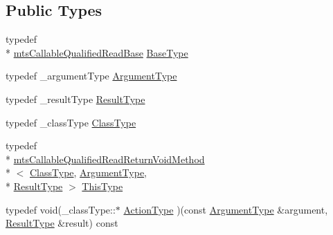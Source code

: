 \subsection*{Public Types}
\begin{DoxyCompactItemize}
\item 
typedef \\*
\hyperlink{classmts_callable_qualified_read_base}{mts\-Callable\-Qualified\-Read\-Base} \hyperlink{classmts_callable_qualified_read_return_void_method_ac485c35956ba406a7863f66264b290d4}{Base\-Type}
\item 
typedef \-\_\-argument\-Type \hyperlink{classmts_callable_qualified_read_return_void_method_a6edb7e6ad0ead0f74cfe2751d45532c5}{Argument\-Type}
\item 
typedef \-\_\-result\-Type \hyperlink{classmts_callable_qualified_read_return_void_method_a533ffd51ea529b0a585985eaf06ab08f}{Result\-Type}
\item 
typedef \-\_\-class\-Type \hyperlink{classmts_callable_qualified_read_return_void_method_ae99cfab8208eb374f2cdf01c97edfa3b}{Class\-Type}
\item 
typedef \\*
\hyperlink{classmts_callable_qualified_read_return_void_method}{mts\-Callable\-Qualified\-Read\-Return\-Void\-Method}\\*
$<$ \hyperlink{classmts_callable_qualified_read_return_void_method_ae99cfab8208eb374f2cdf01c97edfa3b}{Class\-Type}, \hyperlink{classmts_callable_qualified_read_return_void_method_a6edb7e6ad0ead0f74cfe2751d45532c5}{Argument\-Type}, \\*
\hyperlink{classmts_callable_qualified_read_return_void_method_a533ffd51ea529b0a585985eaf06ab08f}{Result\-Type} $>$ \hyperlink{classmts_callable_qualified_read_return_void_method_a916abe9c683c314f85c9b67c960a67f9}{This\-Type}
\item 
typedef void(\-\_\-class\-Type\-::$\ast$ \hyperlink{classmts_callable_qualified_read_return_void_method_a7ac7450d5dce9ad80db720a370118211}{Action\-Type} )(const \hyperlink{classmts_callable_qualified_read_return_void_method_a6edb7e6ad0ead0f74cfe2751d45532c5}{Argument\-Type} \&argument, \hyperlink{classmts_callable_qualified_read_return_void_method_a533ffd51ea529b0a585985eaf06ab08f}{Result\-Type} \&result) const 
\end{DoxyCompactItemize}
